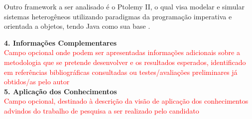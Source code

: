Outro framework a ser analisado é o Ptolemy II, o qual visa modelar e simular sistemas heterogêneos utilizando paradigmas da programação imperativa e orientada a objetos, tendo Java como sua base \cite{PtolemyII}.

\noindent
\textbf{4. Informações Complementares}\\
\noindent
\textcolor{red}{Campo opcional onde podem ser apresentadas informações adicionais sobre a metodologia que se pretende desenvolver e os resultados esperados, identificado em referências bibliográficas consultadas ou testes/avaliações preliminares já obtidos/as pelo autor} 
\\


\noindent
\textbf{5. Aplicação dos Conhecimentos}\\
\noindent
\textcolor{red}{Campo opcional, destinado à descrição da visão de aplicação dos conhecimentos advindos do trabalho de pesquisa a ser realizado pelo candidato}
\\